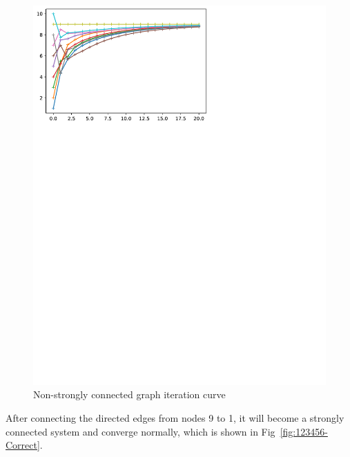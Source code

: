 \documentclass[conference]{IEEEtran}
\begin{document}
\begin{figure}[htbp]
    \centering
    \includegraphics[width=\columnwidth]{123456-Error.pdf}
    \caption{Non-strongly connected graph iteration curve}
    \label{fig:123456-Error}
\end{figure}

After connecting the directed edges from nodes 9 to 1, it will become a strongly connected system and converge normally, which is shown in Fig~\ref{fig:123456-Correct}.
\end{document}
